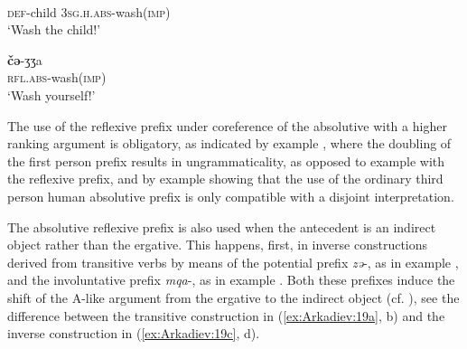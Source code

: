 \documentclass[output=paper]{langscibook}
\begin{document}
\ea 
\label{ex:Arkadiev:17}
    \ea 
    \label{ex:Arkadiev:17a}
    \\
       \textsc{def}{}-child  \textsc{3sg.h.abs}{}-wash(\textsc{imp})\\
    \glt  ‘Wash the child!’
    
    \ex 
    \label{ex:Arkadiev:17b}
    \gll  \textbf{{č{ə}}}{{}-{ʒ}{ʒ}a}\\
    \textsc{rfl.abs}{}-wash(\textsc{imp})\\
    \glt  ‘Wash yourself!’
    \z
\z
 

The use of the reflexive prefix under coreference of the absolutive with a higher ranking argument is obligatory, as indicated by example , where the doubling of the first person prefix results in ungrammaticality, as opposed to example  with the reflexive prefix, and by example  showing that the use of the ordinary third person human absolutive prefix is only compatible with a disjoint interpretation.

\ea
\label{ex:Arkadiev:18}
    
    
    \z
\z
    
The absolutive reflexive prefix is also used when the antecedent is an indirect object rather than the ergative. This happens, first, in inverse constructions derived from transitive verbs by means of the potential prefix \textit{z{ə}}{}-, as in example , and the involuntative prefix \textit{mqa}{}-, as in example . Both these prefixes induce the shift of the A-like argument from the ergative to the indirect object (cf. \citet[185]{OHerin2002}), see the difference between the transitive construction in (\ref{ex:Arkadiev:19a}, b) and the inverse construction in (\ref{ex:Arkadiev:19c}, d).
\end{document}
